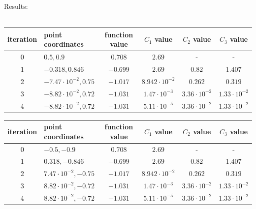 \documentclass[12pt]{article}
\begin{document}
	\begin{table}[H]
		Results: \\\\
		\begin{tabularx}{\textwidth}{c|X|c|c|c|c|}
			iteration & point coordinates & function value & $C_1$ value & $C_2$ value & $C_3$ value\\
			\hline
			0 & $0.5, 0.9$ & $0.708$ & $2.69$ & - & - \\
			\hline
			1 & $-0.318, 0.846$ & $-0.699$ & $2.69$ & $0.82$ & $1.407$ \\
			\hline
			2 & $-7.47\cdot10^{-2}, 0.75$ & $-1.017$ & $8.942\cdot10^{-2}$ & $0.262$ & $0.319$ \\
			\hline
			3 & $-8.82\cdot10^{-2}, 0.72$ & $-1.031$ & $1.47\cdot10^{-3}$ & $3.36\cdot10^{-2}$ & $1.33\cdot10^{-2}$ 	\\
			\hline		
			4 & $-8.82\cdot10^{-2}, 0.72$ & $-1.031$ & $5.11\cdot10^{-5}$ & $3.36\cdot10^{-2}$ & $1.33\cdot10^{-2}$ 	\\
			\hline		
		\end{tabularx}	
	\end{table}	

	\begin{table}[H]
		\begin{tabularx}{\textwidth}{c|X|c|c|c|c|}
			iteration & point coordinates & function value & $C_1$ value & $C_2$ value & $C_3$ value\\
			\hline
			0 & $-0.5, -0.9$ & $0.708$ & $2.69$ & - & - \\
			\hline
			1 & $0.318, -0.846$ & $-0.699$ & $2.69$ & $0.82$ & $1.407$ \\
			\hline
			2 & $7.47\cdot10^{-2}, -0.75$ & $-1.017$ & $8.942\cdot10^{-2}$ & $0.262$ & $0.319$ \\
			\hline
			3 & $8.82\cdot10^{-2}, -0.72$ & $-1.031$ & $1.47\cdot10^{-3}$ & $3.36\cdot10^{-2}$ & $1.33\cdot10^{-2}$ 	\\
			\hline		
			4 & $8.82\cdot10^{-2}, -0.72$ & $-1.031$ & $5.11\cdot10^{-5}$ & $3.36\cdot10^{-2}$ & $1.33\cdot10^{-2}$ 	\\
			\hline		
		\end{tabularx}	
	\end{table}
	
\end{document}
